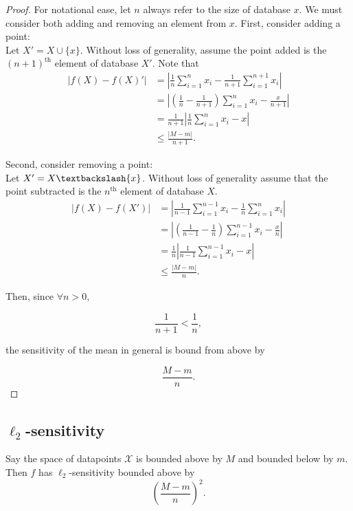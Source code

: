\documentclass[11pt]{scrartcl} %
\begin{document}
\begin{proof}
For notational ease, let $n$ always refer to the size of database $x$. We must consider both adding and removing an element from $x$. First, consider adding a point:\\

Let $X' = X \cup \{x\}$. Without loss of generality, assume the point added is the $(n+1)^{\text{th}}$ element of database $X'$. Note that
\begin{align*}
\left \vert f(X) - f(X)' \right\vert &= \left\vert \frac{1}{n} \sum_{i=1}^n x_i - \frac{1}{n+1} \sum_{i=1}^{n+1} x_i \right\vert \\
	&= \left\vert \left(\frac{1}{n} - \frac{1}{n+1}\right) \sum_{i=1}^n x_i - \frac{x}{n+1}\right\vert \\
	&= \frac{1}{n+1} \left\vert \frac{1}{n} \sum_{i=1}^n x_i - x \right\vert \\
	&\le \frac{ \left\vert M - m \right\vert}{n+1}.
\end{align*}

Second, consider removing a point: \\
Let $X' = X\textbackslash\{x\}$. Without loss of generality assume that the point subtracted is the $n^{\text{th}}$ element of database $X$.
\begin{align*}
\left \vert f(X) - f(X') \right\vert &= \left\vert \frac{1}{n-1} \sum_{i=1}^{n-1} x_i - \frac{1}{n} \sum_{i=1}^n x_i \right\vert \\
	&= \left\vert \left(\frac{1}{n-1} - \frac{1}{n}\right) \sum_{i=1}^{n-1} x_i - \frac{x}{n}\right\vert \\
	&= \frac{1}{n} \left\vert \frac{1}{n-1} \sum_{i=1}^{n-1} x_i  - x \right\vert \\
	&\le \frac{\left\vert M-m\right\vert}{n}.
\end{align*}

Then, since $\forall n > 0,$

$$ \frac{1}{n+1} < \frac{1}{n},$$

the sensitivity of the mean in general is bound from above by 

$$ \frac{M-m}{n}.$$
\end{proof}

\subsection{$\ell_2$-sensitivity}

\begin{theorem}
Say the space of datapoints $\mathcal{X}$ is bounded above by $M$ and bounded below by $m$. Then $f$ has $\ell_2$-sensitivity bounded above by
	$$ \left( \frac{M-m}{n} \right)^2. $$
\end{theorem}
\end{document}

